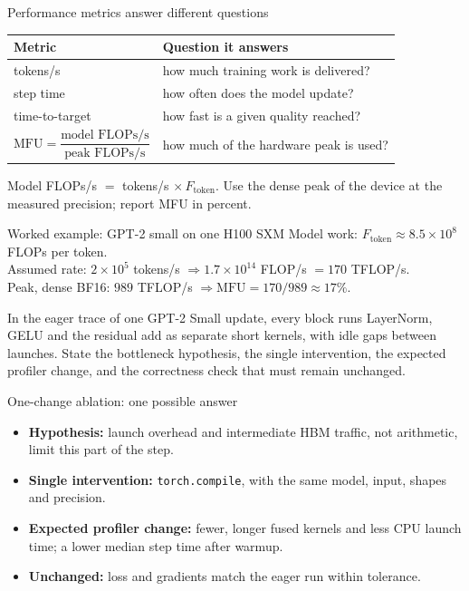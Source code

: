 \documentclass[handout]{beamer}
\begin{document}
\begin{frame}{Performance metrics answer different questions}
  \small
  \begin{center}
    \begin{tabular}{@{}ll@{}}
      \toprule
      Metric & Question it answers \\
      \midrule
      tokens/s & how much training work is delivered? \\
      step time & how often does the model update? \\
      time-to-target & how fast is a given quality reached? \\[3pt]
      $\mathrm{MFU}=\dfrac{\text{model FLOPs/s}}{\text{peak FLOPs/s}}$ & how much of the hardware peak is used? \\[6pt]
      \bottomrule
    \end{tabular}
  \end{center}
  \footnotesize Model FLOPs/s $=$ tokens/s $\times\,F_{\text{token}}$. Use the dense peak of the device at the measured precision; report MFU in percent.
  \begin{exampleblock}{Worked example: GPT-2 small on one H100 SXM}
    \footnotesize
    Model work: $F_{\text{token}}\approx 8.5\times10^{8}$ FLOPs per token.\\
    Assumed rate: $2\times10^{5}$ tokens/s
    $\Rightarrow 1.7\times10^{14}$ FLOP/s $=170$ TFLOP/s.\\
    Peak, dense BF16: $989$ TFLOP/s
    $\Rightarrow \mathrm{MFU}=170/989\approx 17\%$.
  \end{exampleblock}
\end{frame}

{In the eager trace of one GPT-2 Small update, every block runs LayerNorm, GELU and the residual add as separate short kernels, with idle gaps between launches. State the bottleneck hypothesis, the single intervention, the expected profiler change, and the correctness check that must remain unchanged.}

\begin{frame}{One-change ablation: one possible answer}
  \begin{itemize}
      \setlength{\itemsep}{8pt}
    \item \textbf{Hypothesis:} launch overhead and intermediate HBM traffic, not arithmetic, limit this part of the step.
    \item \textbf{Single intervention:} \texttt{torch.compile}, with the same model, input, shapes and precision.
    \item \textbf{Expected profiler change:} fewer, longer fused kernels and less CPU launch time; a lower median step time after warmup.
    \item \textbf{Unchanged:} loss and gradients match the eager run within tolerance.
  \end{itemize}
\end{frame}
\end{document}
